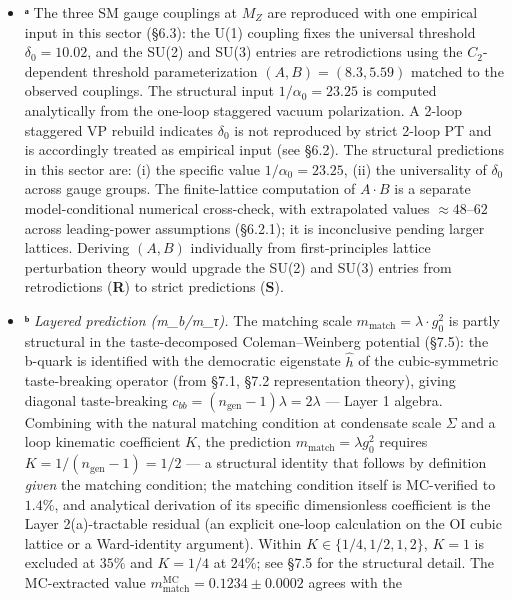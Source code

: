 \documentclass[
]{article}
\begin{document}
\begin{itemize}
\item
  \textbf{ᵃ} The three SM gauge couplings at \(M_Z\) are reproduced with
  one empirical input in this sector (§6.3): the U(1) coupling fixes the
  universal threshold \(\delta_0 = 10.02\), and the SU(2) and SU(3)
  entries are retrodictions using the \(C_2\)-dependent threshold
  parameterization \((A, B) = (8.3, 5.59)\) matched to the observed
  couplings. The structural input \(1/\alpha_0 = 23.25\) is computed
  analytically from the one-loop staggered vacuum polarization. A 2-loop
  staggered VP rebuild indicates \(\delta_0\) is not reproduced by
  strict 2-loop PT and is accordingly treated as empirical input (see
  §6.2). The structural predictions in this sector are: (i) the specific
  value \(1/\alpha_0 = 23.25\), (ii) the universality of \(\delta_0\)
  across gauge groups. The finite-lattice computation of \(A \cdot B\)
  is a separate model-conditional numerical cross-check, with
  extrapolated values \(\approx 48\)--\(62\) across leading-power
  assumptions (§6.2.1); it is inconclusive pending larger lattices.
  Deriving \((A, B)\) individually from first-principles lattice
  perturbation theory would upgrade the SU(2) and SU(3) entries from
  retrodictions (\textbf{R}) to strict predictions (\textbf{S}).
\item
  \textbf{ᵇ} \emph{Layered prediction (m\_b/m\_τ).} The matching scale
  \(m_{\text{match}} = \lambda \cdot g_0^2\) is partly structural in the
  taste-decomposed Coleman--Weinberg potential (§7.5): the b-quark is
  identified with the democratic eigenstate \(\hat{h}\) of the
  cubic-symmetric taste-breaking operator (from §7.1, §7.2
  representation theory), giving diagonal taste-breaking
  \(c_{bb} = (n_{\text{gen}} - 1) \lambda = 2\lambda\) --- Layer 1
  algebra. Combining with the natural matching condition at condensate
  scale \(\Sigma\) and a loop kinematic coefficient \(K\), the
  prediction \(m_{\text{match}} = \lambda g_0^2\) requires
  \(K = 1/(n_{\text{gen}} - 1) = 1/2\) --- a structural identity that
  follows by definition \emph{given} the matching condition; the
  matching condition itself is MC-verified to \(1.4\%\), and analytical
  derivation of its specific dimensionless coefficient is the Layer
  2(a)-tractable residual (an explicit one-loop calculation on the OI
  cubic lattice or a Ward-identity argument). Within
  \(K \in \{1/4, 1/2, 1, 2\}\), \(K = 1\) is excluded at \(35\%\) and
  \(K = 1/4\) at \(24\%\); see §7.5 for the structural detail. The
  MC-extracted value
  \(m_{\text{match}}^{\text{MC}} = 0.1234 \pm 0.0002\) agrees with the

\end{itemize}
\end{document}
